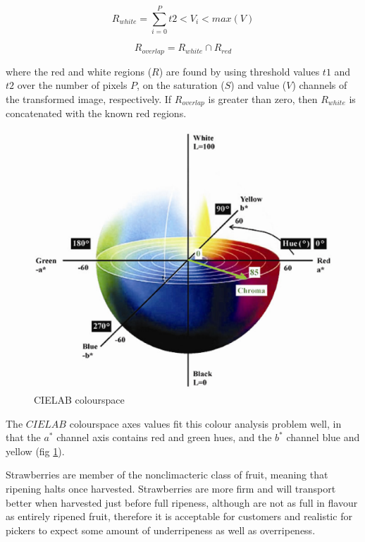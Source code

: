 \documentclass[conference]{IEEEtran}
\begin{document}
\begin{equation}
	R_{white} = \sum_{i=0}^{P}t2<V_i<max(V)
	\label{white_berry_thresh}
\end{equation}

\begin{equation}
	R_{overlap} = R_{white} \cap R_{red}
	\label{intersect_white_berry}
\end{equation}

where the red and white regions ($R$) are found by using threshold values $t1$ and $t2$ over the number of pixels $P$, on the saturation ($S$) and value ($V$) channels of the transformed image, respectively. If $R_{overlap}$ is greater than zero, then $R_{white}$ is concatenated with the known red regions. 
 

\begin{figure}[h]
	\centering
	\includegraphics[scale=0.35]{eps/CIELab-colour-space.eps}
	\caption{CIELAB colourspace}
	\label{fig:lab}
\end{figure}


The $CIELAB$ colourspace axes values fit this colour analysis problem well, in that the $a^*$ channel axis contains red and green hues, and the $b^*$ channel blue and yellow (fig \ref{fig:lab}). 

Strawberries are member of the nonclimacteric class of fruit, meaning that ripening halts once harvested. Strawberries are more firm and will transport better when harvested just before full ripeness, although are not as full in flavour as entirely ripened fruit\cite{artur}, therefore it is acceptable for customers and realistic for pickers to expect some amount of underripeness as well as overripeness.
\end{document}
